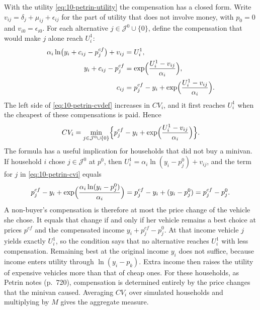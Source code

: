 With the utility \eqref{eq:10-petrin-utility} the compensation has a closed form. Write $v_{ij} = \delta_j + \mu_{ij}
+ \epsilon_{ij}$ for the part of utility that does not involve money, with $p_0 = 0$ and $v_{i0} = \epsilon_{i0}$.
For each alternative $j \in \mathcal{J}^0\cup\{0\}$, define the compensation that would make $j$ alone reach $U_i^1$:
\begin{align*}
  \alpha_i\ln\bigl(y_i + c_{ij} - p^{cf}_j\bigr) + v_{ij} &= U_i^1, \\
  y_i + c_{ij} - p^{cf}_j &= \exp\Bigl(\frac{U_i^1 - v_{ij}}{\alpha_i}\Bigr), \\
  c_{ij} &= p^{cf}_j - y_i + \exp\Bigl(\frac{U_i^1 - v_{ij}}{\alpha_i}\Bigr).
\end{align*}
The left side of \eqref{eq:10-petrin-cvdef} increases in $CV_i$, and it first reaches $U_i^1$ when the cheapest of
these compensations is paid. Hence
\begin{equation}\label{eq:10-petrin-cvi}
  CV_i = \min_{j \in \mathcal{J}^0 \cup \{0\}} \Bigl\{ p^{cf}_j - y_i + \exp\Bigl(\frac{U_i^1 - v_{ij}}{\alpha_i}\Bigr) \Bigr\}.
\end{equation}
The formula has a useful implication for households that did not buy a minivan. If household $i$ chose $j \in
\mathcal{J}^0$ at $p^0$, then $U_i^1 = \alpha_i\ln(y_i - p^0_j) + v_{ij}$, and the term for $j$ in
\eqref{eq:10-petrin-cvi} equals
\begin{equation*}
  p^{cf}_j - y_i + \exp\Bigl(\frac{\alpha_i\ln(y_i - p^0_j)}{\alpha_i}\Bigr) = p^{cf}_j - y_i + (y_i - p^0_j)
  = p^{cf}_j - p^0_j .
\end{equation*}
A non-buyer's compensation is therefore at most the price change of the vehicle she chose. It equals that change if
and only if her vehicle remains a best choice at prices $p^{cf}$ and the compensated income $y_i + p^{cf}_j - p^0_j$.
At that income vehicle $j$ yields exactly $U_i^1$, so the condition says that no alternative reaches $U_i^1$ with
less compensation. Remaining best at the original income $y_i$ does not suffice, because income enters utility
through $\ln(y_i - p_k)$. Extra income then raises the utility of expensive vehicles more than that of cheap ones.
For these households, as Petrin notes (p.~720), compensation is
determined entirely by the price changes that the minivan caused. Averaging $CV_i$ over simulated households and
multiplying by $M$ gives the aggregate measure.


